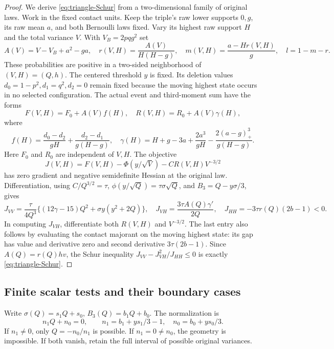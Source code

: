 \begin{proof}
We derive \eqref{eq:triangle-Schur} from a two-dimensional family of
original laws. Work in the fixed contact units. Keep the triple's
raw lower supports $0,g$, its raw mean $a$, and both Bernoulli laws
fixed. Vary its highest raw support $H$ and the total variance $V$.
With $V_B=2pqg^2$ set
\[
 A(V)=V-V_B+a^2-ga,\quad
 r(V,H)=\frac{A(V)}{H(H-g)},\quad
 m(V,H)=\frac{a-Hr(V,H)}g,\quad l=1-m-r.
\]
These probabilities are positive in a two-sided neighborhood of
$(V,H)=(Q,h)$. The centered threshold $y$ is fixed. Its deletion
values $d_0=1-p^2,d_1=q^2,d_2=0$ remain fixed because the moving
highest state occurs in no selected configuration. The actual event
and third-moment sum have the forms
\[
 F(V,H)=F_0+A(V)f(H),\quad R(V,H)=R_0+A(V)\gamma(H),
\]
where
\[
 f(H)=\frac{d_0-d_2}{gH}+\frac{d_2-d_1}{g(H-g)},\quad
 \gamma(H)=H+g-3a+\frac{2a^3}{gH}
                       -\frac{2(a-g)_+^3}{g(H-g)}.
\]
Here $F_0$ and $R_0$ are independent of $V,H$. The objective
\[
 J(V,H)=F(V,H)-\Phi(y/\sqrt V)-CR(V,H)V^{-3/2}
\]
has zero gradient and negative semidefinite Hessian at the original
law. Differentiation, using $C/Q^{3/2}=\tau$,
$\phi(y/\sqrt Q)=\tau\sigma\sqrt Q$, and
$B_3=Q-y\sigma/3$, gives
\[
 J_{VV}=\frac{\tau}{4Q^3}
       \{(12\gamma-15)Q^2+\sigma y(y^2+2Q)\},\quad
 J_{VH}=\frac{3\tau A(Q)\gamma'}{2Q},\quad
 J_{HH}=-3\tau r(Q)(2b-1)<0.
\]
In computing $J_{VH}$, differentiate both $R(V,H)$ and
$V^{-3/2}$. The last entry also
follows by evaluating the contact majorant on the moving highest
state: its gap has value and derivative zero and second derivative
$3\tau(2b-1)$. Since $A(Q)=r(Q)hv$, the Schur inequality
$J_{VV}-J_{VH}^2/J_{HH}\le0$ is exactly
\eqref{eq:triangle-Schur}.
\end{proof}

\subsection{Finite scalar tests and their boundary cases}
\label{subsec:triangle-interval}
Write
$\sigma(Q)=s_1Q+s_0$, $B_3(Q)=b_1Q+b_0$. The normalization is
\[
              n_1Q+n_0=0,\qquad
 n_1=b_1+ys_1/3-1,\quad n_0=b_0+ys_0/3.
\]
If $n_1\ne0$, only $Q=-n_0/n_1$ is possible. If $n_1=0\ne n_0$,
the geometry is impossible. If both vanish, retain the full interval
of possible original variances.

